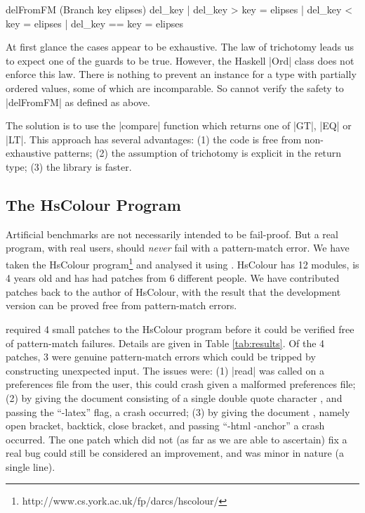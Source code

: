 \begin{code}
delFromFM (Branch key elipses) del_key  | del_key  >   key = elipses
                                        | del_key  <   key = elipses
                                        | del_key  ==  key = elipses
\end{code}

At first glance the cases appear to be exhaustive. The law of trichotomy leads us to expect one of the guards to be true. However, the Haskell |Ord| class does not enforce this law. There is nothing to prevent an instance for a type with partially ordered values, some of which are incomparable. So \catch{} cannot verify the safety to |delFromFM| as defined as above.

The solution is to use the |compare| function which returns one of |GT|, |EQ| or |LT|. This approach has several advantages: (1) the code is free from non-exhaustive patterns; (2) the assumption of trichotomy is explicit in the return type; (3) the library is faster.


\subsection{The HsColour Program}
\label{sec:hscolour}

Artificial benchmarks are not necessarily intended to be fail-proof. But a real program, with real users, should \textit{never} fail with a pattern-match error. We have taken the HsColour program\footnote{http://www.cs.york.ac.uk/fp/darcs/hscolour/} and analysed it using \catch{}. HsColour has 12 modules, is 4 years old and has had patches from 6 different people.
We have contributed patches back to the author of HsColour, with the result that the development version can be proved free from pattern-match errors.

\catch{} required 4 small patches to the HsColour program before it could be verified free of pattern-match failures. Details are given in Table \ref{tab:results}. Of the 4 patches, 3 were genuine pattern-match errors which could be tripped by constructing unexpected input. The issues were: (1) |read| was called on a preferences file from the user, this could crash given a malformed preferences file; (2) by giving the document consisting of a single double quote character , and passing the ``-latex'' flag, a crash occurred; (3) by giving the document , namely open bracket, backtick, close bracket, and passing ``-html -anchor'' a crash occurred. The one patch which did not (as far as we are able to ascertain) fix a real bug could still be considered an improvement, and was minor in nature (a single line).

